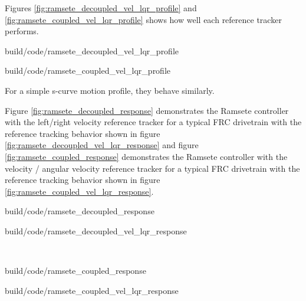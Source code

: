 Figures \ref{fig:ramsete_decoupled_vel_lqr_profile} and
\ref{fig:ramsete_coupled_vel_lqr_profile} shows how well each \gls{reference}
tracker performs.

\begin{bookfigure}
  \begin{minisvg}{build/code/ramsete_decoupled_vel_lqr_profile}
    \caption{Left/right velocity reference tracker response to a motion profile}
    \label{fig:ramsete_decoupled_vel_lqr_profile}
  \end{minisvg}
  \hfill
  \begin{minisvg}{build/code/ramsete_coupled_vel_lqr_profile}
    \caption{Linear/angular velocity reference tracker response to a motion
      profile}
    \label{fig:ramsete_coupled_vel_lqr_profile}
  \end{minisvg}
\end{bookfigure}

For a simple s-curve motion profile, they behave similarly.

Figure \ref{fig:ramsete_decoupled_response} demonstrates the Ramsete controller
with the left/right velocity \gls{reference} tracker for a typical FRC
drivetrain with the \gls{reference} tracking behavior shown in figure
\ref{fig:ramsete_decoupled_vel_lqr_response} and figure
\ref{fig:ramsete_coupled_response} demonstrates the Ramsete controller with the
velocity / angular velocity \gls{reference} tracker for a typical FRC drivetrain
with the \gls{reference} tracking behavior shown in figure
\ref{fig:ramsete_coupled_vel_lqr_response}.

\begin{bookfigure}
  \begin{minisvg}{build/code/ramsete_decoupled_response}
    \caption{Ramsete controller response with left/right velocity reference
      tracker ($b = 2$, $\zeta = 0.7$)}
    \label{fig:ramsete_decoupled_response}
  \end{minisvg}
  \hfill
  \begin{minisvg}{build/code/ramsete_decoupled_vel_lqr_response}
    \caption{Ramsete controller's left/right velocity reference tracker
      response}
    \label{fig:ramsete_decoupled_vel_lqr_response}
  \end{minisvg} \\
  \begin{minisvg}{build/code/ramsete_coupled_response}
    \caption{Ramsete controller response with velocity / angular velocity
      reference tracker ($b = 2$, $\zeta = 0.7$)}
    \label{fig:ramsete_coupled_response}
  \end{minisvg}
  \hfill
  \begin{minisvg}{build/code/ramsete_coupled_vel_lqr_response}
    \caption{Ramsete controller's velocity / angular velocity reference tracker
      response}
    \label{fig:ramsete_coupled_vel_lqr_response}
  \end{minisvg}
\end{bookfigure}

